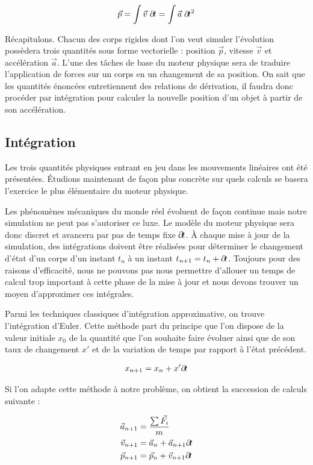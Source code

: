 \begin{align*}
  \vec{p} = \int \vec{v}\; \partial \! t = \int \vec{a}\; \partial \! t^2
\end{align*}

Récapitulons. Chacun des corps rigides dont l'on veut simuler
l'évolution possèdera trois quantités sous forme vectorielle :
position $\vec p$, vitesse $\vec v$ et accélération $\vec a$. L'une
des tâches de base du moteur physique sera de traduire l'application
de forces sur un corps en un changement de sa position. On sait que
les quantités énoncées entretiennent des relations de dérivation, il
faudra donc procéder par intégration pour calculer la nouvelle
position d'un objet à partir de son accélération.

\subsection{Intégration}

Les trois quantités physiques entrant en jeu dans les mouvements
linéaires ont été présentées. \'Etudions maintenant de façon plus
concrète sur quels calculs se basera l'exercice le plus élémentaire du
moteur physique.

Les phénomènes mécaniques du monde réel évoluent de façon continue
mais notre simulation ne peut pas s'autoriser ce luxe. Le modèle du
moteur physique sera donc discret et avancera par pas de temps fixe
$\partial \! t$. \`A chaque mise à jour de la simulation, des intégrations
doivent être réalisées pour déterminer le changement d'état d'un corps
d'un instant $t_n$ à un instant $t_{n+1} = t_n + \partial \! t$. Toujours
pour des raisons d'efficacité, nous ne pouvons pas nous permettre
d'allouer un temps de calcul trop important à cette phase de la mise à
jour et nous devons trouver un moyen d'approximer ces intégrales.

Parmi les techniques classiques d'intégration approximative, on trouve
l'intégration d'Euler. Cette méthode part du principe que l'on dispose
de la valeur initiale $x_0$ de la quantité que l'on souhaite faire
évoluer ainsi que de son taux de changement $x'$ et de la variation de
temps par rapport à l'état précédent.

\begin{align*}
  x_{n+1} = x_{n} + x' \partial \! t
\end{align*}

Si l'on adapte cette méthode à notre problème, on obtient la
succession de calculs suivante :

\begin{align*}
  \vec{a}_{n+1} &= \frac{\sum \vec{F}_i}{m} \\ \vec{v}_{n+1} &=
  \vec{a}_n + \vec{a}_{n+1} \partial \! t \\ \vec{p}_{n+1} &= \vec{p}_n +
  \vec{v}_{n+1} \partial \! t
\end{align*}

